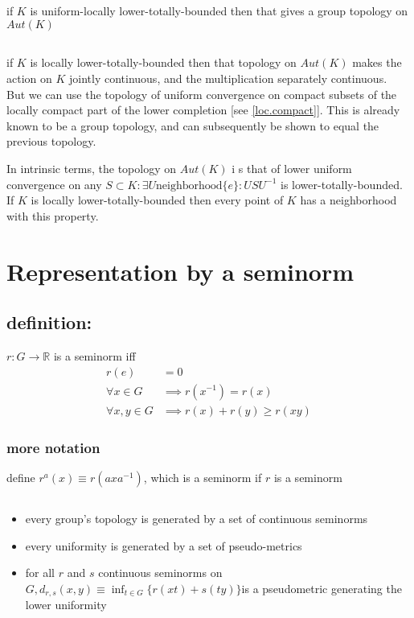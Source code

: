 \documentclass[a4paper]{article}
\newcommand{\R}{\mathbb{R}}
\newcommand{\inv }{^{-1}}
\begin{document}
\subsection{} if $K$ is uniform-locally lower-totally-bounded then that gives a group topology on $Aut(K)$
\subsection{} if $K$ is locally lower-totally-bounded then that topology on $Aut(K)$ makes the action on $K$ jointly continuous, and the multiplication separately continuous.
\\But we can use the topology of uniform convergence on compact subsets of the locally compact part of the lower completion [see \ref{loc.compact}]. This is already known to be a group topology, and can subsequently be shown to equal the previous topology.

In intrinsic terms, the topology on $Aut(K)$ i s that of lower uniform convergence on any $S\subset K: \exists U \text{neighborhood} \{e\}: U S U\inv $ is lower-totally-bounded. If $K$ is locally lower-totally-bounded then every point of $K$ has a neighborhood with this property.
\section{Representation by a seminorm}
\subsection{definition:} $r:G\to\R$ is a seminorm iff \begin{equation*}\begin{split}r(e)&=0 \\\forall x\in G&\implies r(x\inv )=r(x) \\ \forall x,y\in G &\implies r(x)+r(y)\geq r(x y) \end{split}\end{equation*}
\subsubsection*{more notation} define $r^a(x)\equiv r(a x a\inv )$, which is a seminorm if $r$ is a seminorm
\subsection{}
\begin{itemize}
\item  every group’s topology is generated by a set of continuous seminorms
\item every uniformity is generated by a set of pseudo-metrics
\item for all $r$ and $s$ continuous seminorms on $G, d_{r,s}(x,y) \equiv \inf_{t\in G}\{r(xt)+s(ty)\}$is a pseudometric generating the lower uniformity
\end{itemize}
\end{document}

